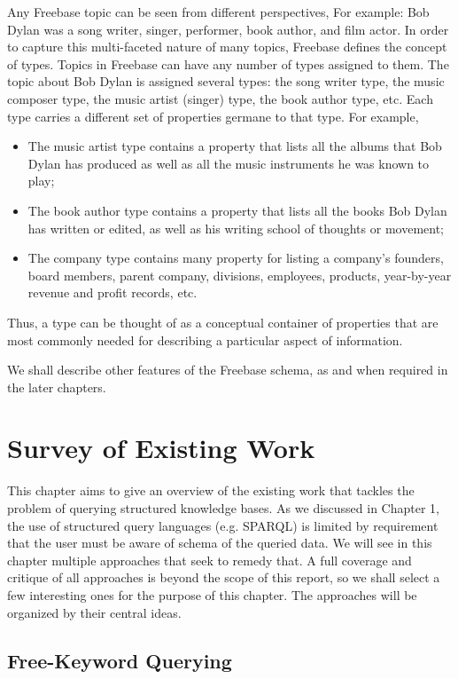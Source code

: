 \documentclass[a4paper, twoside, 12pt]{report}
\begin{document}
Any Freebase topic can be seen from different perspectives, For example: Bob Dylan was a song writer, singer, performer, book author, and film actor. In order to capture this multi-faceted nature of many topics, Freebase defines the concept of types. Topics in Freebase can have any number of types assigned to them. The topic about Bob Dylan is assigned several types: the song writer type, the music composer type, the music artist (singer) type, the book author type, etc. Each type carries a different set of properties germane to that type. For example,
\begin{itemize}
\item The music artist type contains a property that lists all the albums that Bob Dylan has produced as well as all the music instruments he was known to play;
\item The book author type contains a property that lists all the books Bob Dylan has written or edited, as well as his writing school of thoughts or movement;
\item The company type contains many property for listing a company's founders, board members, parent company, divisions, employees, products, year-by-year revenue and profit records, etc.
\end{itemize}
Thus, a type can be thought of as a conceptual container of properties that are most commonly needed for describing a particular aspect of information.

We shall describe other features of the Freebase schema, as and when required in the later chapters.

\chapter[Survey]{Survey of Existing Work}

This chapter aims to give an overview of the existing work that tackles the problem of querying structured knowledge bases. As we discussed in Chapter 1, the use of structured query languages (e.g. SPARQL) is limited by requirement that the user must be aware of schema of the queried data. We will see in this chapter multiple approaches that seek to remedy that. A full coverage and critique of all approaches is beyond the scope of this report, so we shall select a few interesting ones for the purpose of this chapter. The approaches will be organized by their central ideas.

\section[Keyword Queries]{Free-Keyword Querying}
\end{document}
